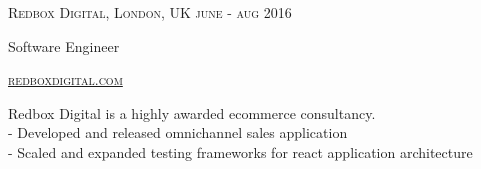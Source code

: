 {
  \textsc{\small{Redbox Digital, London, UK
    \hfill
      {\raggedleft
        june - aug 2016
      } \\
    }
  }
  {\raggedright\large {
      Software Engineer
  }}

  \textsc{\small\href{http://www.redboxdigital.com}{redboxdigital.com}}

  \normalsize{\raggedright
    Redbox Digital is a highly awarded ecommerce consultancy. \\
    - Developed and released omnichannel sales application \\
    - Scaled and expanded testing frameworks for react application architecture \\
  }
}
